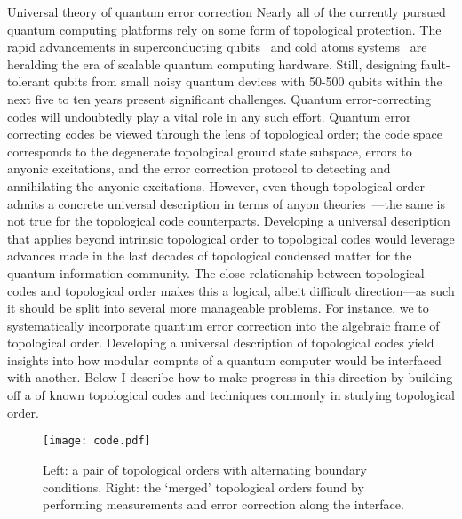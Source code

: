 {Universal theory of quantum error correction}
{Nearly all of the currently pursued quantum computing platforms rely on some form of topological protection.
The rapid advancements in superconducting qubits~\cite{Arute2019,IBM2020} and cold atoms systems~\cite{Bernien2017} are heralding the era of scalable quantum computing hardware. Still, designing fault-tolerant qubits from small noisy quantum devices with 50-500 qubits within the next five to ten years present significant challenges. Quantum error-correcting codes will undoubtedly play a vital role in any such effort. Quantum error correcting codes  be viewed through the lens of topological order; the code space corresponds to the degenerate topological ground state subspace, errors to anyonic excitations, and the error correction protocol to detecting and annihilating the anyonic excitations. However, even though topological order admits a concrete universal description in terms of anyon theories~\cite{Kitaev2006}---the same is not true for the topological code counterparts.
}
Developing a universal description that applies beyond intrinsic topological order to topological codes would leverage advances made in the last  decades of topological condensed matter for the quantum information community.
The close relationship between topological codes and topological order makes this a logical, albeit difficult  direction---as such it should be split into several more manageable problems.
For instance, we  to systematically incorporate quantum error correction into the algebraic frame of topological order.
Developing a universal description of topological codes   yield insights into how modular compnts of a quantum computer would be interfaced with  another. 
Below I describe how to make progress in this direction by building off a  of known topological codes and techniques commonly  in studying topological order.
\begin{figure}[htbp]
   \centering
   \texttt{[image: code.pdf]}
   \caption{Left: a pair of topological orders with alternating boundary conditions. 
   Right: the `merged' topological orders found by performing measurements and error correction along the interface.}
   \label{code}
\end{figure}




